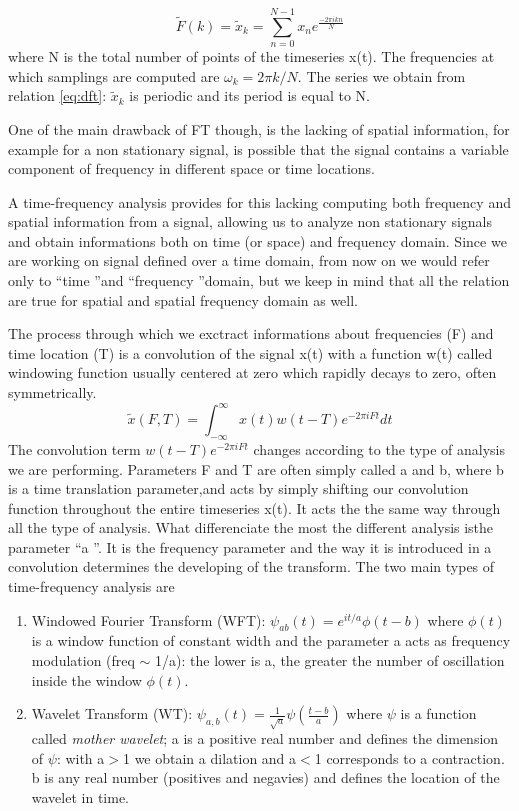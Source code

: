 \documentclass[11pt]{report}
\begin{document}
\begin{equation}\label{eq:dft}
 \tilde{F}(k) = \tilde{x}_k = \sum_{n = 0}^{N-1}x_n e^{\frac{-2\pi i k n}{N}}
\end{equation}
where N is the total number of points of the timeseries x(t).
The frequencies at which samplings are computed are $\omega_k = 2\pi k/N$.
The series we obtain from relation \ref{eq:dft}: $\tilde{x}_k$ is periodic and its period is equal to N.

One of the main drawback of FT though, is the lacking of spatial information, for example for a non stationary signal, is possible that the signal contains a variable component of frequency in different space or time locations.

A time-frequency analysis provides for this lacking computing both frequency and spatial information from a signal, allowing us to analyze non stationary signals and obtain informations both on time (or space) and frequency domain.
Since we are working on signal defined over a time domain, from now on we would refer only to  \textquotedblleft time \textquotedblright  and  \textquotedblleft frequency \textquotedblright domain, but we keep in mind that all the relation are true for spatial and spatial frequency domain as well.

The process through which we exctract informations about frequencies (F) and time location (T) is a convolution of the signal x(t) with a function w(t) called windowing function usually centered at zero which rapidly decays to zero, often symmetrically.
\begin{equation}
\tilde{x}(F, T) = \int_{-\infty}^{\infty} x(t)w(t-T) e^{-2\pi i F t} dt
\end{equation}
The convolution term $w(t-T) e^{-2\pi i F t}$ changes according to the type of analysis we are performing. Parameters F and T are often simply called a and b, where b is a time translation parameter,and acts by simply shifting our convolution function throughout the entire timeseries x(t). It acts the the same way through all the type of analysis.
What differenciate the most the different analysis isthe parameter \textquotedblleft a \textquotedblright.
It is the frequency parameter and the way it is introduced in a convolution determines the developing of the transform.
The two main types of time-frequency analysis are

\begin{enumerate}
\item Windowed Fourier Transform (WFT): $\psi_{ab}(t) = e^{it/a}\phi(t-b)$ where $\phi(t)$ is a window function of constant width and the parameter a acts as frequency modulation (freq $\sim$ 1/a): the lower is a, the greater the number of oscillation inside the window $\phi(t)$.
\item Wavelet Transform (WT): $\psi_{a, b}(t) = \frac{1}{\sqrt{a}}\psi(\frac{t-b}{a})$ where $\psi$ is a function called \emph{mother wavelet}; a is a positive real number and defines the dimension of $\psi$: with a$>$1 we obtain a dilation and a$<$1 corresponds to a contraction. b is any real number (positives and negavies) and defines the location of the wavelet in time.
\end{enumerate}
\end{document}
